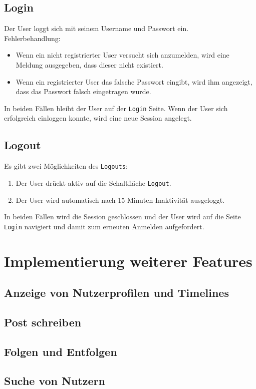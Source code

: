 \subsection{Login}
Der User loggt sich mit seinem Username und Passwort ein. \\
Fehlerbehandlung:
\begin{itemize}
  \item Wenn ein nicht registrierter User versucht sich anzumelden, wird eine Meldung ausgegeben, dass dieser nicht existiert.
  \item Wenn ein registrierter User das falsche Passwort eingibt, wird ihm angezeigt, dass das Passwort falsch eingetragen wurde.
\end{itemize}
In beiden Fällen bleibt der User auf der \texttt{Login} Seite.
Wenn der User sich erfolgreich einloggen konnte, wird eine neue Session angelegt.

\subsection{Logout}
Es gibt zwei Möglichkeiten des \texttt{Logouts}:
\begin{enumerate}
  \item Der User drückt aktiv auf die Schaltfläche \texttt{Logout}.
  \item Der User wird automatisch nach 15 Minuten Inaktivität ausgeloggt.
\end{enumerate}
In beiden Fällen wird die Session geschlossen und der User wird auf die Seite \texttt{Login} navigiert und damit zum erneuten Anmelden aufgefordert.

\newpage
\section{Implementierung weiterer Features}
\subsection{Anzeige von Nutzerprofilen und Timelines}
\subsection{Post schreiben}
\subsection{Folgen und Entfolgen}
\subsection{Suche von Nutzern}
